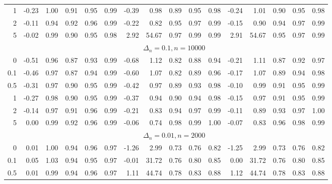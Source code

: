 \documentclass{article}
\theoremstyle{plain}
\theoremstyle{definition}
\theoremstyle{remark}
\begin{document}
\begin{appendix}
{\begin{table}[ht]
\begin{tabular}{r|rrrrr|rrrrr|rrrrr}
  1 & -0.23 & 1.00 & 0.91 & 0.95 & 0.99 & -0.39 & 0.98 & 0.89 & 0.95 & 0.98 & -0.24 & 1.01 & 0.90 & 0.95 & 0.98 \\ 
  2 & -0.11 & 0.94 & 0.92 & 0.96 & 0.99 & -0.22 & 0.82 & 0.95 & 0.97 & 0.99 & -0.15 & 0.90 & 0.94 & 0.97 & 0.99 \\ 
  5 & -0.02 & 0.99 & 0.90 & 0.95 & 0.98 & 2.92 & 54.67 & 0.97 & 0.99 & 0.99 & 2.91 & 54.67 & 0.95 & 0.97 & 0.99 \\ 
		\midrule
	&\multicolumn{15}{c}{$\Delta_n=0.1, n= 10000$}
	\\
0 & -0.51 & 0.96 & 0.87 & 0.93 & 0.99 & -0.68 & 1.12 & 0.82 & 0.88 & 0.94 & -0.21 & 1.11 & 0.87 & 0.92 & 0.97 \\ 
  0.1 & -0.46 & 0.97 & 0.87 & 0.94 & 0.99 & -0.60 & 1.07 & 0.82 & 0.89 & 0.96 & -0.17 & 1.07 & 0.89 & 0.94 & 0.98 \\ 
  0.5 & -0.31 & 0.97 & 0.90 & 0.95 & 0.99 & -0.42 & 0.97 & 0.89 & 0.93 & 0.98 & -0.10 & 0.99 & 0.91 & 0.95 & 0.99 \\ 
  1 & -0.27 & 0.98 & 0.90 & 0.95 & 0.99 & -0.37 & 0.94 & 0.90 & 0.94 & 0.98 & -0.15 & 0.97 & 0.91 & 0.95 & 0.99 \\ 
  2 & -0.14 & 0.97 & 0.91 & 0.96 & 0.99 & -0.21 & 0.83 & 0.94 & 0.97 & 0.99 & -0.11 & 0.89 & 0.93 & 0.97 & 1.00 \\ 
  5 & 0.00 & 0.99 & 0.92 & 0.96 & 0.99 & -0.06 & 0.74 & 0.98 & 0.99 & 1.00 & -0.07 & 0.83 & 0.96 & 0.98 & 0.99 \\ 
	\midrule
	\midrule
	&\multicolumn{15}{c}{$\Delta_n=0.01, n= 2000$}
	\\
0 & 0.01 & 1.00 & 0.94 & 0.96 & 0.97 & -1.26 & 2.99 & 0.73 & 0.76 & 0.82 & -1.25 & 2.99 & 0.73 & 0.76 & 0.82 \\ 
  0.1 & 0.05 & 1.03 & 0.94 & 0.95 & 0.97 & -0.01 & 31.72 & 0.76 & 0.80 & 0.85 & 0.00 & 31.72 & 0.76 & 0.80 & 0.85 \\ 
  0.5 & 0.01 & 0.99 & 0.94 & 0.96 & 0.97 & 1.11 & 44.74 & 0.78 & 0.83 & 0.88 & 1.12 & 44.74 & 0.78 & 0.83 & 0.88 \\ 

\end{tabular}
\end{table}}
\end{appendix}
\end{document}
